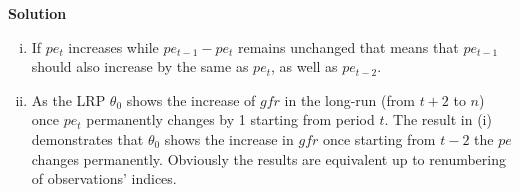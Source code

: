 \documentclass[a4paper]{article}
\begin{document}
\textbf{Solution}

\begin{enumerate}[(i)]
	\item If $pe_t$ increases while $pe_{t-1} - pe_t$ remains unchanged that means that $pe_{t-1}$ should also increase by the same as $pe_t$, as well as $pe_{t-2}$.
	\item As the LRP $\theta_0$ shows the increase of $gfr$ in the long-run (from $t+2$ to $n$) once $pe_t$ permanently changes by 1 starting from period $t$. The result in (i) demonstrates that $\theta_0$ shows the increase in $gfr$ once starting from $t-2$ the $pe$ changes permanently. Obviously the results are equivalent up to renumbering of observations' indices. 
\end{enumerate}
\end{document}
